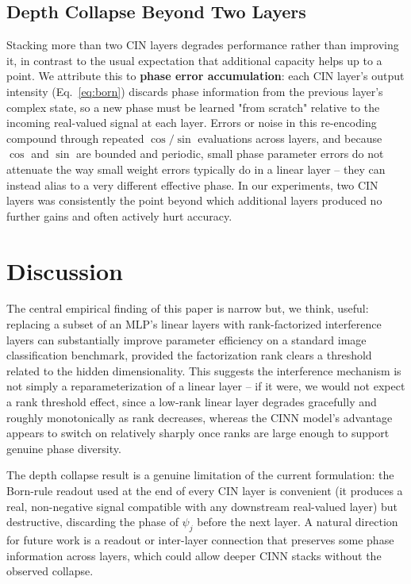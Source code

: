 \documentclass[11pt]{article}
\begin{document}
\subsection{Depth Collapse Beyond Two Layers}
Stacking more than two CIN layers degrades performance rather than improving it, in contrast to the usual expectation that additional capacity helps up to a point. We attribute this to \textbf{phase error accumulation}: each CIN layer's output intensity (Eq.~\ref{eq:born}) discards phase information from the previous layer's complex state, so a new phase must be learned "from scratch" relative to the incoming real-valued signal at each layer. Errors or noise in this re-encoding compound through repeated $\cos/\sin$ evaluations across layers, and because $\cos$ and $\sin$ are bounded and periodic, small phase parameter errors do not attenuate the way small weight errors typically do in a linear layer -- they can instead alias to a very different effective phase. In our experiments, two CIN layers was consistently the point beyond which additional layers produced no further gains and often actively hurt accuracy.

\section{Discussion}
\label{sec:discussion}

The central empirical finding of this paper is narrow but, we think, useful: replacing a subset of an MLP's linear layers with rank-factorized interference layers can substantially improve parameter efficiency on a standard image classification benchmark, provided the factorization rank clears a threshold related to the hidden dimensionality. This suggests the interference mechanism is not simply a reparameterization of a linear layer -- if it were, we would not expect a rank threshold effect, since a low-rank linear layer degrades gracefully and roughly monotonically as rank decreases, whereas the CINN model's advantage appears to switch on relatively sharply once ranks are large enough to support genuine phase diversity.

The depth collapse result is a genuine limitation of the current formulation: the Born-rule readout used at the end of every CIN layer is convenient (it produces a real, non-negative signal compatible with any downstream real-valued layer) but destructive, discarding the phase of $\psi_j$ before the next layer. A natural direction for future work is a readout or inter-layer connection that preserves some phase information across layers, which could allow deeper CINN stacks without the observed collapse.
\end{document}

